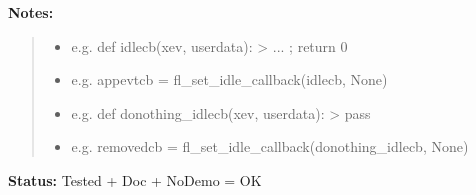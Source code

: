 \begin{boxedminipage}{\funcwidth}
\textbf{Notes:}
\begin{quote}
  \begin{itemize}

  \item
    \setlength{\parskip}{0.6ex}

e.g. def idlecb(xev, userdata): > ... ; return 0


  \item 
e.g. appevtcb = fl\_set\_idle\_callback(idlecb, None)


  \item 
e.g. def donothing\_idlecb(xev, userdata): > pass


  \item 
e.g. removedcb = fl\_set\_idle\_callback(donothing\_idlecb, None)


\end{itemize}

\end{quote}

\textbf{Status:} 
Tested + Doc + NoDemo = OK


    \end{boxedminipage}

    \label{xformslib:flxbasic:fl_addto_selected_xevent}

    \vspace{0.5ex}

